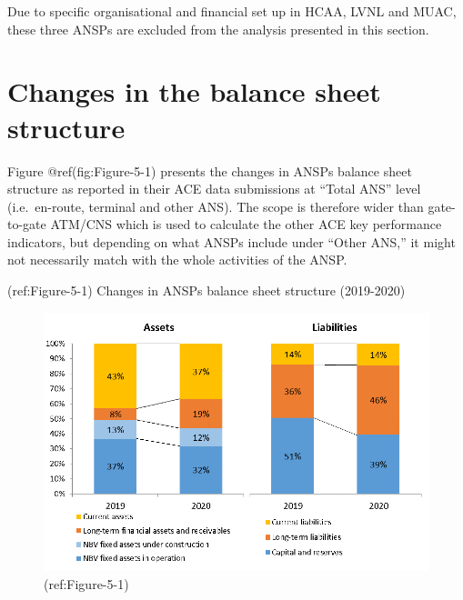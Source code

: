 \documentclass[
]{book}
\begin{document}
Due to specific organisational and financial set up in HCAA, LVNL and
MUAC, these three ANSPs are excluded from the analysis presented in this
section.

\hypertarget{covid_1}{%
\section{Changes in the balance sheet structure}\label{covid_1}}

Figure @ref(fig:Figure-5-1) presents the changes in ANSPs balance sheet
structure as reported in their ACE data submissions at ``Total ANS''
level (i.e.~en-route, terminal and other ANS). The scope is therefore
wider than gate-to-gate ATM/CNS which is used to calculate the other ACE
key performance indicators, but depending on what ANSPs include under
``Other ANS,'' it might not necessarily match with the whole activities
of the ANSP.

(ref:Figure-5-1) Changes in ANSPs balance sheet structure (2019-2020)

\begin{figure}

{\centering \includegraphics[width=0.7\linewidth]{figures/Figure-5-1} 

}

\caption{(ref:Figure-5-1)}\label{fig:Figure-5-1}
\end{figure}
\end{document}
